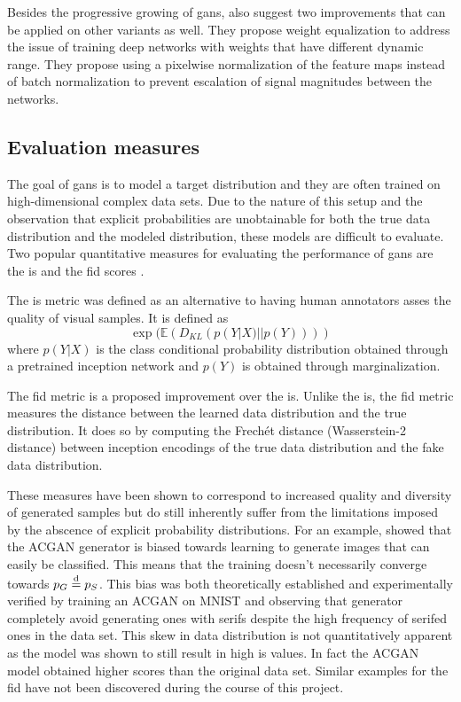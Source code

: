 Besides the progressive growing of \acrshort{gans}, \textcite{karras2017progressive} also suggest two improvements that can be applied on other variants as well. They propose weight equalization to address the issue of training deep networks with weights that have different dynamic range. They propose using a pixelwise normalization of the feature maps instead of batch normalization to prevent escalation of signal magnitudes between the networks.

\subsection{Evaluation measures}
The goal of \acrshort{gans} is to model a target distribution and they are often trained on high-dimensional complex data sets. Due to the nature of this setup and the observation that explicit probabilities are unobtainable for both the true data distribution and the modeled distribution, these models are difficult to evaluate. Two popular quantitative measures for evaluating the performance of \acrshort{gans} are the \acrfull{is} \parencite{salimans2016improved} and the \acrfull{fid} scores \parencite{heuselRUNKH2017FID}.

The \acrlong{is} metric was defined as an alternative to having human annotators asses the quality of visual samples. It is defined as 
\begin{equation}
    \exp (\mathbb{E}(D_{KL}(p(Y|X) || p(Y))))
\end{equation}
where $p(Y|X)$ is the class conditional probability distribution obtained through a pretrained inception network and $p(Y)$ is obtained through marginalization. 

The \acrlong{fid} metric is a proposed improvement over the \acrlong{is}. Unlike the \acrlong{is}, the \acrlong{fid} metric measures the distance between the learned data distribution and the true distribution. It does so by computing the Frechét distance (Wasserstein-2 distance) between inception encodings of the true data distribution and the fake data distribution.

These measures have been shown to correspond to increased quality and diversity of generated samples but do still inherently suffer from the limitations imposed by the abscence of explicit probability distributions. For an example, \textcite{shuac2017acganisbad} showed that the ACGAN generator is biased towards learning to generate images that can easily be classified. This means that the training doesn't necessarily converge towards $p_G \stackrel{\text{d}}{=} p_S$. This bias was both theoretically established and experimentally verified by training an ACGAN on MNIST and observing that generator completely avoid generating ones with serifs despite the high frequency of serifed ones in the data set. This skew in data distribution is not quantitatively apparent as the model was shown to still result in high \acrshort{is} values. In fact the ACGAN model obtained higher scores than the original data set. Similar examples for the \acrshort{fid} have not been discovered during the course of this project. 

